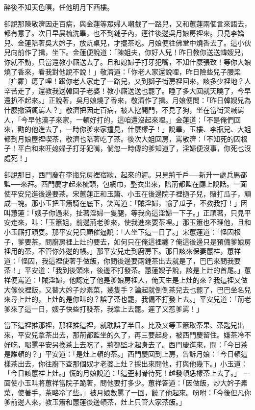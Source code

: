 醉後不知天色暝，任他明月下西樓。

卻說那陳敬濟因走百病，與金蓮等眾婦人嘲戲了一路兒，又和蕙蓮兩個言來語去，都有意了。次日早晨梳洗畢，也不到鋪子內，逕往後邊吳月娘房裡來。只見李嬌兒、金蓮陪著吳大妗子，放炕桌兒，才擺茶吃。月娘便往佛堂中燒香去了。這小伙兒向前作了揖，坐下。金蓮便說道：「陳姐夫，你好人兒！昨日教你送送韓嫂兒，你就不動，只當還教小廝送去了。且和媳婦子打牙犯嘴，不知什麼張致！等你大娘燒了香來，看我對他說不說！」敬濟道：「你老人家還說哩，昨日險些兒子腰梁〔疒羅〕瘍了哩！跟你老人家走了一路兒，又到獅子街房裡回來，該多少裡地？人辛苦走了，還教我送韓回子老婆！教小廝送送也罷了。睡了多大回就天曉了，今早還扒不起來。」正說著，吳月娘燒了香來，敬濟作了揖。月娘便問：「昨日韓嫂兒為什麼撒酒瘋罵人？」敬濟把因走百病，被人挖開門，不見了狗，坐在當街哭喊罵人，「今早他漢子來家，一頓好打的，這咱還沒起來哩。」金蓮道：「不是俺們回來，勸的他進去了，一時你爹來家撞見，什麼樣子！」說畢，玉樓、李瓶兒、大姐都到月娘屋裡喫茶，敬濟也陪著吃了茶。後次大姐回房，罵敬濟：「不知死的囚根子！平白和來旺媳婦子打牙犯嘴，倘忽一時傳的爹知道了，淫婦便沒事，你死也沒處死！」

卻說那日，西門慶在李瓶兒房裡宿歇，起來的遲。只見荊千戶──新升一處兵馬都監──來拜。西門慶才起來梳頭，包網巾，整衣出來，陪荊都監在廳上說話。一面使平安兒進後邊要茶。宋蕙蓮正和玉簫、小玉在後邊院子裡撾子兒，賭打瓜子，頑成一塊。那小玉把玉簫騎在底下，笑罵道：「賊淫婦，輸了瓜子，不教我打！」因叫蕙蓮：「嫂子你過來，扯著淫婦一隻腿，等我肏這淫婦一下子。」正頑著，只見平安走來，叫：「玉簫姐，前邊荊老爹來，使我進來要茶哩。」那玉簫也不理他，且和小玉廝打頑耍。那平安兒只顧催逼說：「人坐下這一日了。」宋蕙蓮道：「怪囚根子，爹要茶，問廚房裡上灶的要去，如何只在俺這裡纏？俺這後邊只是預備爹娘房裡用的茶，不管你外邊的帳。」那平安兒走到廚房下。那日該來保妻蕙祥，蕙祥道：「怪囚，我這裡使著手做飯，你問後邊要兩鍾茶出去就是了，巴巴來問我要茶！」平安道：「我到後頭來，後邊不打發茶。蕙蓮嫂子說，該是上灶的首尾。」蕙祥便罵道：「賊淫婦，他認定了他是爹娘房裡人，俺天生是上灶的來？我這裡又做大傢伙裡飯，又替大妗子炒素菜，幾隻手？論起就倒倒茶兒去也罷了，巴巴坐名兒來尋上灶的，上灶的是你叫的？誤了茶也罷，我偏不打發上去。」平安兒道：「荊老爹來了這一日，嫂子快些打發茶，我拿上去罷。遲了又惹爹罵！」

當下這裡推那裡，那裡推這裡，就耽誤了半日。比及又等玉簫取茶果、茶匙兒出來，平安兒拿茶出去，那荊都監坐的久了，再三要起身，被西門慶留住。嫌茶冷不好吃，喝罵平安另換茶上去吃了，荊都監才起身去了。西門慶進來，問：「今日茶是誰頓的？」平安道：「是灶上頓的茶。」西門慶回到上房，告訴月娘：「今日頓這樣茶出去，你往廚下查那個奴才老婆上灶？採出來問他，打與他幾下。」小玉道：「今日該蕙祥上灶。」慌的月娘說道：「這歪剌骨待死！越發頓恁樣茶上去了。」 一面使小玉叫將蕙祥當院子跪著，問他要打多少。蕙祥答道：「因做飯，炒大妗子素菜，使著手，茶略冷了些。」被月娘數罵了一回，饒了他起來。吩咐：「今後但凡你爹前邊人來，教玉簫和蕙蓮後邊頓茶，灶上只管大家茶飯。」

